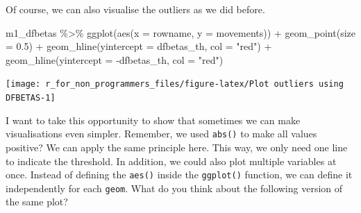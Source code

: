 \documentclass[
]{book}
\newenvironment{Shaded}{\begin{snugshade}}{\end{snugshade}}
\newcommand{\AttributeTok}[1]{\textcolor[rgb]{0.77,0.63,0.00}{#1}}
\newcommand{\FloatTok}[1]{\textcolor[rgb]{0.00,0.00,0.81}{#1}}
\newcommand{\FunctionTok}[1]{\textcolor[rgb]{0.00,0.00,0.00}{#1}}
\newcommand{\NormalTok}[1]{#1}
\newcommand{\SpecialCharTok}[1]{\textcolor[rgb]{0.00,0.00,0.00}{#1}}
\newcommand{\StringTok}[1]{\textcolor[rgb]{0.31,0.60,0.02}{#1}}
\begin{document}
Of course, we can also visualise the outliers as we did before.

\begin{Shaded}
\begin{Highlighting}[]
\NormalTok{m1\_dfbetas }\SpecialCharTok{\%\textgreater{}\%}
  \FunctionTok{ggplot}\NormalTok{(}\FunctionTok{aes}\NormalTok{(}\AttributeTok{x =}\NormalTok{ rowname,}
             \AttributeTok{y =}\NormalTok{ movements)) }\SpecialCharTok{+}
  \FunctionTok{geom\_point}\NormalTok{(}\AttributeTok{size =} \FloatTok{0.5}\NormalTok{) }\SpecialCharTok{+}
  \FunctionTok{geom\_hline}\NormalTok{(}\AttributeTok{yintercept =}\NormalTok{ dfbetas\_th, }\AttributeTok{col =} \StringTok{"red"}\NormalTok{) }\SpecialCharTok{+}
  \FunctionTok{geom\_hline}\NormalTok{(}\AttributeTok{yintercept =} \SpecialCharTok{{-}}\NormalTok{dfbetas\_th, }\AttributeTok{col =} \StringTok{"red"}\NormalTok{)}
\end{Highlighting}
\end{Shaded}

\begin{center}\texttt{[image: r\_for\_non\_programmers\_files/figure-latex/Plot outliers using DFBETAS-1]} \end{center}

I want to take this opportunity to show that sometimes we can make visualisations even simpler. Remember, we used \texttt{abs()} to make all values positive? We can apply the same principle here. This way, we only need one line to indicate the threshold. In addition, we could also plot multiple variables at once. Instead of defining the \texttt{aes()} inside the \texttt{ggplot()} function, we can define it independently for each \texttt{geom}. What do you think about the following version of the same plot?
\end{document}
